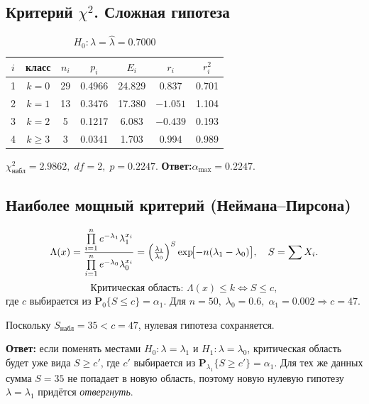 \documentclass[areasetadvanced]{scrartcl}
\begin{document}
\subsection{Критерий \(\chi^{2}\). Сложная гипотеза}
\begin{longtable}{ccccccc}
\caption{$H_0:\lambda=\hat\lambda=0.7000$}\label{tab:chi2}\\[-1pt]\toprule
$i$ & класс & $n_i$ & $p_i$ & $E_i$ & $r_i$ & $r_i^2$\\\midrule
1 & $k=0$ & 29 & 0.4966 & 24.829 & 0.837 & 0.701\\
2 & $k=1$ & 13 & 0.3476 & 17.380 & $-1.051$ & 1.104\\
3 & $k=2$ & 5 & 0.1217 & 6.083 & $-0.439$ & 0.193\\
4 & $k\ge3$ & 3 & 0.0341 & 1.703 & 0.994 & 0.989\\
\bottomrule
\end{longtable}
\(\chi^2_{\text{набл}}=2.9862,\;df=2,\;p=0.2247\).
\textbf{Ответ:}\;\(\alpha_{\max}=0.2247.\)

\subsection{Наиболее мощный критерий (Неймана–Пирсона)}
\[
\Lambda(x)=\frac{\prod\limits_{i=1}^{n}e^{-\lambda_1}\lambda_1^{x_i}}
                 {\prod\limits_{i=1}^{n}e^{-\lambda_0}\lambda_0^{x_i}}
          =\Bigl(\tfrac{\lambda_1}{\lambda_0}\Bigr)^{S}
           \exp\!\bigl[-n(\lambda_1-\lambda_0)\bigr],
\quad
S=\sum X_i.
\]
\[
\text{Критическая область: } \Lambda(x)\le k
\Longleftrightarrow S\le c,
\]
где \(c\) выбирается из
\(\mathbf P_{0}\{S\le c\}=\alpha_1\).
Для \(n=50,\;\lambda_0=0.6,\;\alpha_1=0.002\Rightarrow c=47\).

Поскольку \(S_{\text{набл}}=35<c=47\), нулевая гипотеза сохраняется.  

\textbf{Ответ:} если поменять местами \(H_0:\lambda=\lambda_1\)
и \(H_1:\lambda=\lambda_0\),
критическая область будет уже вида \(S\ge c'\),
где \(c'\) выбирается из
\(\mathbf P_{\lambda_1}\{S\ge c'\}=\alpha_1\).
Для тех же данных сумма \(S=35\) не попадает в новую область,
поэтому новую нулевую гипотезу \(\lambda=\lambda_1\) придётся
\emph{отвергнуть}.


\newpage
\end{document}
